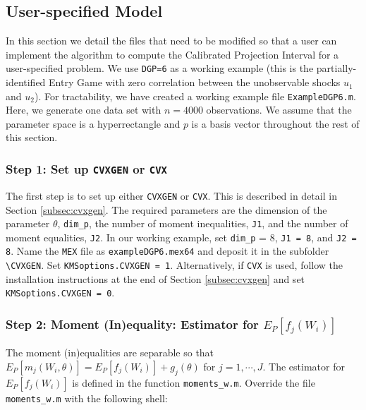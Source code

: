 \documentclass[12pt]{article}
\def\code#1{\texttt{#1}}
\begin{document}
\subsection{User-specified Model}\label{sec:usermodel}
In this section we detail the files that need to be modified so that a user can implement the algorithm to compute the Calibrated Projection Interval for a user-specified problem.  We use \code{DGP=6} as a working example (this is the partially-identified Entry Game with zero correlation between the unobservable shocks $u_1$ and $u_2$).  For tractability, we have created a working example file \code{ExampleDGP6.m}.  Here, we generate one data set with $n=4000$ observations.  We assume that the parameter space is a hyperrectangle and $p$ is a basis vector throughout the rest of this section.

\subsubsection*{Step 1: Set up \code{CVXGEN} or \code{CVX}}

The first step is to set up either \code{CVXGEN} or \code{CVX}.  This is described in detail in Section \ref{subsec:cvxgen}.  The required parameters are the dimension of the parameter $\theta$, \code{dim\_p}, the number of moment inequalities, \code{J1}, and the number of moment equalities, \code{J2}.  In our working example, set \code{dim\_p} = 8, \code{J1 = 8}, and \code{J2 = 8}.  Name the \code{MEX} file as \code{exampleDGP6.mex64} and deposit it in the subfolder \code{\textbackslash CVXGEN}.  Set \code{KMSoptions.CVXGEN = 1}.  Alternatively, if \code{CVX} is used, follow the installation instructions at the end of Section \ref{subsec:cvxgen} and set \code{KMSoptions.CVXGEN = 0}.

\subsubsection*{Step 2: Moment (In)equality: Estimator for $E_P[f_j(W_i)]$}

The moment (in)equalities are separable so that $E_P[m_j(W_i,\theta)] = E_P[f_j(W_i)] + g_j(\theta)$ for $j=1,\cdots,J$.  The estimator for $E_P[f_j(W_i)]$ is defined in the function \code{moments\_w.m}.  Override the  file \code{moments\_w.m} with the following shell:
\end{document}
